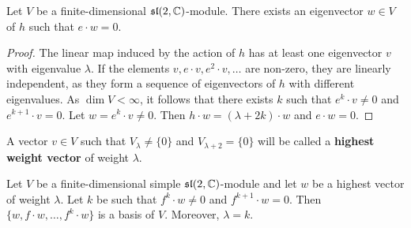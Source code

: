 \begin{lemma}
\label{lem:maximal_weight}
    Let $V$ be a finite-dimensional $\mathfrak{sl}(2,\mathbb{C})$-module.
    There exists an eigenvector 
    $w\in V$ of $h$ such that $e\cdot w=0$. 
\end{lemma}

\begin{proof}
    The linear map induced by the action of $h$ has at least one eigenvector 
    $v$ with eigenvalue $\lambda$. If the elements 
    $v,e\cdot v,e^2\cdot v,\dots$ are non-zero, they are linearly independent, as they 
    form a sequence of eigenvectors of $h$ with different eigenvalues.  
    As $\dim V<\infty$, it follows that there exists $k$ 
    such that $e^k\cdot v\ne 0$ and $e^{k+1}\cdot v=0$. 
    Let $w=e^k\cdot v\ne 0$. 
    Then
    $h\cdot w=(\lambda+2k)\cdot w$ and $e\cdot w=0$. 
\end{proof}

A vector $v\in V$ such that $V_{\lambda}\ne\{0\}$ and
$V_{\lambda+2}=\{0\}$ will be called a \textbf{highest weight vector} 
of weight $\lambda$. 

\begin{lemma}
\label{lem:basis}
    Let $V$ be a finite-dimensional simple $\mathfrak{sl}(2,\mathbb{C})$-module
    and let $w$ be a highest vector of weight $\lambda$. Let 
    $k$ be such that $f^k\cdot w\ne 0$ and $f^{k+1}\cdot w=0$.
    Then $\{w,f\cdot w,\dots,f^{k}\cdot w\}$ is a basis of $V$.
    Moreover, $\lambda=k$.
\end{lemma}

